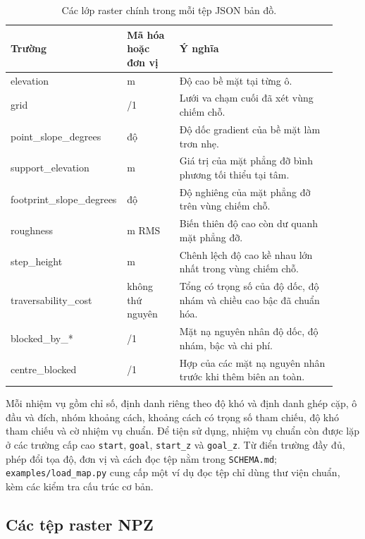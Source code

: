 \documentclass[11pt]{article}
\begin{document}
\begin{table}[htbp]
  \centering
  \caption{Các lớp raster chính trong mỗi tệp JSON bản đồ.}
  \label{tab:raster-fields}
  \small
  \begin{tabular}{>{\ttfamily\raggedright\arraybackslash}p{0.28\linewidth}
                  >{\raggedright\arraybackslash}p{0.16\linewidth}
                  >{\raggedright\arraybackslash}p{0.48\linewidth}}
    \toprule
    \normalfont Trường & Mã hóa hoặc đơn vị & Ý nghĩa \\
    \midrule
    elevation & m & Độ cao bề mặt tại từng ô. \\
    grid & 0/1 & Lưới va chạm cuối đã xét vùng chiếm chỗ. \\
    point\_slope\_degrees & độ & Độ dốc gradient của bề mặt làm trơn nhẹ. \\
    support\_elevation & m & Giá trị của mặt phẳng đỡ bình phương tối thiểu tại tâm. \\
    footprint\_slope\_degrees & độ & Độ nghiêng của mặt phẳng đỡ trên vùng chiếm chỗ. \\
    roughness & m RMS & Biến thiên độ cao còn dư quanh mặt phẳng đỡ. \\
    step\_height & m & Chênh lệch độ cao kề nhau lớn nhất trong vùng chiếm chỗ. \\
    traversability\_cost & không thứ nguyên & Tổng có trọng số của độ dốc, độ nhám và chiều cao bậc đã chuẩn hóa. \\
    blocked\_by\_* & 0/1 & Mặt nạ nguyên nhân độ dốc, độ nhám, bậc và chi phí. \\
    centre\_blocked & 0/1 & Hợp của các mặt nạ nguyên nhân trước khi thêm biên an toàn. \\
    \bottomrule
  \end{tabular}
\end{table}

Mỗi nhiệm vụ gồm chỉ số, định danh riêng theo độ khó và định danh
ghép cặp, ô đầu và đích, nhóm khoảng cách, khoảng cách có trọng số tham chiếu,
độ khó tham chiếu và cờ nhiệm vụ chuẩn. Để tiện sử dụng, nhiệm vụ chuẩn còn
được lặp ở các trường cấp cao \texttt{start}, \texttt{goal},
\texttt{start\_z} và \texttt{goal\_z}. Từ điển trường đầy đủ, phép đổi tọa độ,
đơn vị và cách đọc tệp nằm trong \texttt{SCHEMA.md};
\texttt{examples/load\_map.py} cung cấp một ví dụ đọc tệp chỉ dùng thư viện
chuẩn, kèm các kiểm tra cấu trúc cơ bản.

\subsection{Các tệp raster NPZ}
\end{document}

